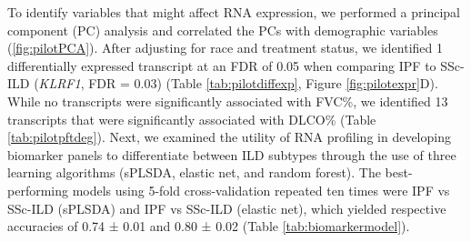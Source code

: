 \documentclass[
]{article}
\begin{document}
To identify variables that might affect RNA expression, we performed a principal component (PC) analysis and correlated the PCs with demographic variables (\ref{fig:pilotPCA}). After adjusting for race and treatment status, we identified 1 differentially expressed transcript at an FDR of 0.05 when comparing IPF to SSc-ILD (\textit{KLRF1}, FDR = 0.03) (Table \ref{tab:pilotdiffexp}, Figure \ref{fig:pilotexpr}D). While no transcripts were significantly associated with FVC\%, we identified 13 transcripts that were significantly associated with DLCO\% (Table \ref{tab:pilotpftdeg}). Next, we examined the utility of RNA profiling in developing biomarker panels to differentiate between ILD subtypes through the use of three learning algorithms (sPLSDA, elastic net, and random forest). The best-performing models using 5-fold cross-validation repeated ten times were IPF vs SSc-ILD (sPLSDA) and IPF vs SSc-ILD (elastic net), which yielded respective accuracies of 0.74 ± 0.01 and 0.80 ± 0.02 (Table \ref{tab:biomarkermodel}).

\newpage

\captionsetup{width=6.5in}
\end{document}
